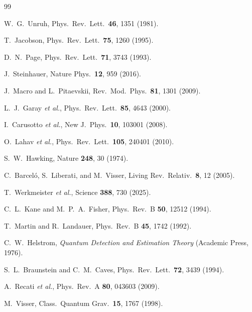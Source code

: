 \documentclass[prd,aps,showpacs,superscriptaddress,twocolumn]{revtex4-2}
\begin{document}
\begin{thebibliography}{99}

 W.~G.~Unruh, Phys.\ Rev.\ Lett.\ \textbf{46}, 1351 (1981).

 T.~Jacobson, Phys.\ Rev.\ Lett.\ \textbf{75}, 1260 (1995).

 D.~N.~Page, Phys.\ Rev.\ Lett.\ \textbf{71}, 3743 (1993).

 J.~Steinhauer, Nature Phys.\ \textbf{12}, 959 (2016).

 J.~Macro and L.~Pitaevskii, Rev.\ Mod.\ Phys.\ \textbf{81}, 1301 (2009).

 L.~J.~Garay \textit{et al.}, Phys.\ Rev.\ Lett.\ \textbf{85}, 4643 (2000).

 I.~Carusotto \textit{et al.}, New J.\ Phys.\ \textbf{10}, 103001 (2008).

 O.~Lahav \textit{et al.}, Phys.\ Rev.\ Lett.\ \textbf{105}, 240401 (2010).

 S.~W.~Hawking, Nature \textbf{248}, 30 (1974).

 C.~Barcel\'o, S.~Liberati, and M.~Visser, Living Rev.\ Relativ.\ \textbf{8}, 12 (2005).

 T.~Werkmeister \textit{et al.}, Science \textbf{388}, 730 (2025).

 C.~L.~Kane and M.~P.~A.~Fisher, Phys.\ Rev.\ B \textbf{50}, 12512 (1994).

 T.~Martin and R.~Landauer, Phys.\ Rev.\ B \textbf{45}, 1742 (1992).

 C.~W.~Helstrom, \textit{Quantum Detection and Estimation Theory} (Academic Press, 1976).

 S.~L.~Braunstein and C.~M.~Caves, Phys.\ Rev.\ Lett.\ \textbf{72}, 3439 (1994).

 A.~Recati \textit{et al.}, Phys.\ Rev.\ A \textbf{80}, 043603 (2009).

 M.~Visser, Class.\ Quantum Grav.\ \textbf{15}, 1767 (1998).

\end{thebibliography}
\end{document}
